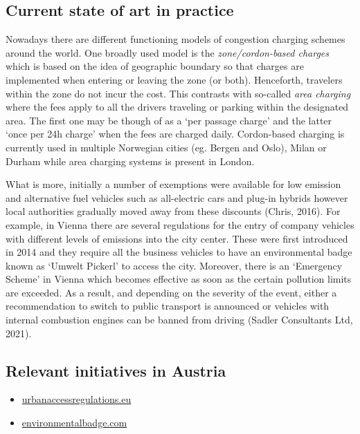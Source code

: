 \documentclass[
]{book}
\providecommand{\tightlist}{%
  \setlength{\itemsep}{0pt}\setlength{\parskip}{0pt}}
\begin{document}
\hypertarget{current-state-of-art-in-practice-8}{%
\subsection*{Current state of art in practice}\label{current-state-of-art-in-practice-8}}

Nowadays there are different functioning models of congestion charging schemes around the world. One broadly used model is the \emph{zone/cordon-based charges} which is based on the idea of geographic boundary so that charges are implemented when entering or leaving the zone (or both). Henceforth, travelers within the zone do not incur the cost. This contrasts with so-called \emph{area charging} where the fees apply to all the drivers traveling or parking within the designated area. The first one may be though of as a `per passage charge' and the latter `once per 24h charge' when the fees are charged daily. Cordon-based charging is currently used in multiple Norwegian cities (eg. Bergen and Oslo), Milan or Durham while area charging systems is present in London.

What is more, initially a number of exemptions were available for low emission and alternative fuel vehicles such as all-electric cars and plug-in hybrids however local authorities gradually moved away from these discounts (Chris, 2016). For example, in Vienna there are several regulations for the entry of company vehicles with different levels of emissions into the city center. These were first introduced in 2014 and they require all the business vehicles to have an environmental badge known as `Umwelt Pickerl' to access the city. Moreover, there is an `Emergency Scheme' in Vienna which becomes effective as soon as the certain pollution limits are exceeded. As a result, and depending on the severity of the event, either a recommendation to switch to public transport is announced or vehicles with internal combustion engines can be banned from driving (Sadler Consultants Ltd, 2021).

\hypertarget{relevant-initiatives-in-austria-8}{%
\subsection*{Relevant initiatives in Austria}\label{relevant-initiatives-in-austria-8}}

\begin{itemize}
\tightlist
\item
  \href{https://urbanaccessregulations.eu/countries-mainmenu-147/austria-mainmenu-78/wien-vienna}{urbanaccessregulations.eu}
\item
  \href{https://www.environmentalbadge.com/environmental-zone-vienna/}{environmentalbadge.com}
\end{itemize}
\end{document}
